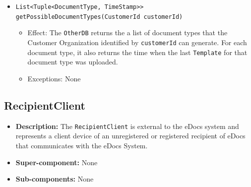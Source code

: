 \documentclass[a4paper,10pt]{article}
\begin{document}
\begin{itemize}
\begin{itemize}
		\item \texttt{List<Tuple<DocumentType, TimeStamp>> getPossibleDocumentTypes(CustomerId customerId)}
		\begin{itemize}
            \item Effect: The \texttt{OtherDB} returns the a list of document types that the Customer Organization identified by \texttt{customerId} can generate. For each document type, it also returns the time when the last \texttt{Template} for that document type was uploaded.  
            \item Exceptions: None
        \end{itemize}
		  
        
    \end{itemize}
\end{itemize}

\subsection{RecipientClient}
\begin{itemize}
    \item \textbf{Description:} The \texttt{RecipientClient} is external to the eDocs system and represents a client device of an unregistered or registered recipient of eDocs that communicates with the eDocs System.
    \item \textbf{Super-component:} None
    \item \textbf{Sub-components:} None
\end{itemize}
\end{document}
